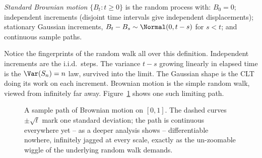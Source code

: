 \begin{definition}
\label{ch26:def-brownian}
\emph{Standard Brownian motion} $\{B_t : t \ge 0\}$ is the random process with:
$B_0 = 0$; independent increments (disjoint time intervals give independent
displacements); stationary Gaussian increments, $B_t - B_s \sim \Normal(0,
t-s)$ for $s < t$; and continuous sample paths.
\end{definition}

Notice the fingerprints of the random walk all over this definition.
Independent increments are the i.i.d.\ steps. The variance $t - s$ growing
linearly in elapsed time is the $\Var(S_n) = n$ law, survived into the limit.
The Gaussian shape is the CLT doing its work on each increment. Brownian
motion is the simple random walk, viewed from infinitely far away.
Figure~\ref{ch26:fig-brownian} shows one such limiting path.

\begin{figure}[H]
\centering
{}
\caption{A sample path of Brownian motion on $[0,1]$. The dashed curves
$\pm\sqrt{t}$ mark one standard deviation; the path is continuous everywhere
yet -- as a deeper analysis shows -- differentiable nowhere, infinitely jagged at
every scale, exactly as the un-zoomable wiggle of the underlying random walk
demands.}
\label{ch26:fig-brownian}
\end{figure}

